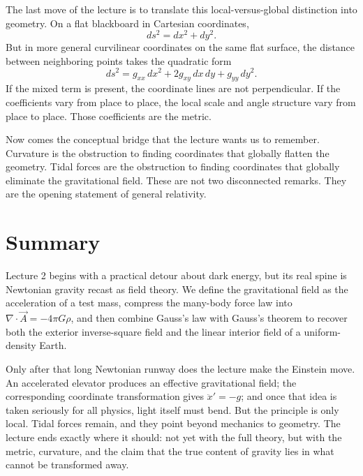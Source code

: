 The last move of the lecture is to translate this local-versus-global distinction into geometry. On a flat blackboard in Cartesian coordinates,
\begin{equation}
ds^2 = dx^2+dy^2.
\end{equation}
But in more general curvilinear coordinates on the same flat surface, the distance between neighboring points takes the quadratic form
\begin{equation}
ds^2 = g_{xx}\,dx^2 + 2g_{xy}\,dx\,dy + g_{yy}\,dy^2.
\end{equation}
If the mixed term is present, the coordinate lines are not perpendicular. If the coefficients vary from place to place, the local scale and angle structure vary from place to place. Those coefficients are the metric.

Now comes the conceptual bridge that the lecture wants us to remember. Curvature is the obstruction to finding coordinates that globally flatten the geometry. Tidal forces are the obstruction to finding coordinates that globally eliminate the gravitational field. These are not two disconnected remarks. They are the opening statement of general relativity.

\section{Summary}

Lecture 2 begins with a practical detour about dark energy, but its real spine is Newtonian gravity recast as field theory. We define the gravitational field as the acceleration of a test mass, compress the many-body force law into $\nabla\cdot\vec A=-4\pi G\rho$, and then combine Gauss's law with Gauss's theorem to recover both the exterior inverse-square field and the linear interior field of a uniform-density Earth.

Only after that long Newtonian runway does the lecture make the Einstein move. An accelerated elevator produces an effective gravitational field; the corresponding coordinate transformation gives $\ddot x'=-g$; and once that idea is taken seriously for all physics, light itself must bend. But the principle is only local. Tidal forces remain, and they point beyond mechanics to geometry. The lecture ends exactly where it should: not yet with the full theory, but with the metric, curvature, and the claim that the true content of gravity lies in what cannot be transformed away.
